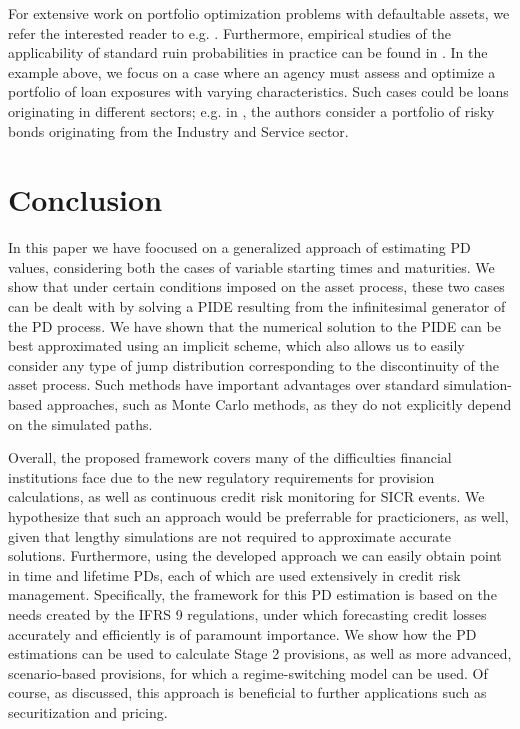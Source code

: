 \documentclass[11pt,reqno]{article}
\theoremstyle{definition}
\begin{document}
\par For extensive work on portfolio optimization problems with defaultable assets, we refer the interested reader to e.g. \cite{asanga2014portfolio}. Furthermore, empirical studies of the applicability of standard ruin probabilities in practice can be found in \cite{braun2015solvency}. In the example above, we focus on a case where an agency must assess and optimize a portfolio of loan exposures with varying characteristics. Such cases could be loans originating in different sectors; e.g. in \cite{pasricha2020portfolio}, the authors consider a portfolio of risky bonds originating from the Industry and Service sector.


\section{Conclusion}
In this paper we have foocused on a generalized approach of estimating PD values, considering both the cases of variable starting times and maturities. We show that under certain conditions imposed on the asset process, these two cases can be dealt with by solving a PIDE resulting from the infinitesimal generator of the PD process. We have shown that the numerical solution to the PIDE can be best approximated using an implicit scheme, which also allows us to easily consider any type of jump distribution corresponding to the discontinuity of the asset process. Such methods have important advantages over standard simulation-based approaches, such as Monte Carlo methods, as they do not explicitly depend on the simulated paths.
\par Overall, the proposed framework covers many of the difficulties financial institutions face due to the new regulatory requirements for provision calculations, as well as continuous credit risk monitoring for SICR events. We hypothesize that such an approach would be preferrable for practicioners, as well, given that lengthy simulations are not required to approximate accurate solutions. Furthermore, using the developed approach we can easily obtain point in time and lifetime PDs, each of which are used extensively in credit risk management. Specifically, the framework for this PD estimation is based on the needs created by the IFRS 9 regulations, under which forecasting credit losses accurately and efficiently is of paramount importance. We show how the PD estimations can be used to calculate Stage 2 provisions, as well as more advanced, scenario-based provisions, for which a regime-switching model can be used. Of course, as discussed, this approach is beneficial to further applications such as securitization and pricing. 
\end{document}
